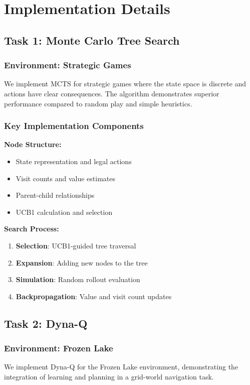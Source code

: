 \documentclass[12pt]{article}
\numberwithin{equation}{section}
\numberwithin{figure}{section}
\numberwithin{table}{section}
\numberwithin{algorithm}{section}
\begin{document}
{{{%
\section{Implementation Details}

\subsection{Task 1: Monte Carlo Tree Search}

\subsubsection{Environment: Strategic Games}
We implement MCTS for strategic games where the state space is discrete and actions have clear consequences. The algorithm demonstrates superior performance compared to random play and simple heuristics.

\subsubsection{Key Implementation Components}

\textbf{Node Structure:}
\begin{itemize}
    \item State representation and legal actions
    \item Visit counts and value estimates
    \item Parent-child relationships
    \item UCB1 calculation and selection
\end{itemize}

\textbf{Search Process:}
\begin{enumerate}
    \item \textbf{Selection}: UCB1-guided tree traversal
    \item \textbf{Expansion}: Adding new nodes to the tree
    \item \textbf{Simulation}: Random rollout evaluation
    \item \textbf{Backpropagation}: Value and visit count updates
\end{enumerate}

\subsection{Task 2: Dyna-Q}

\subsubsection{Environment: Frozen Lake}
We implement Dyna-Q for the Frozen Lake environment, demonstrating the integration of learning and planning in a grid-world navigation task.

}}}
\end{document}
